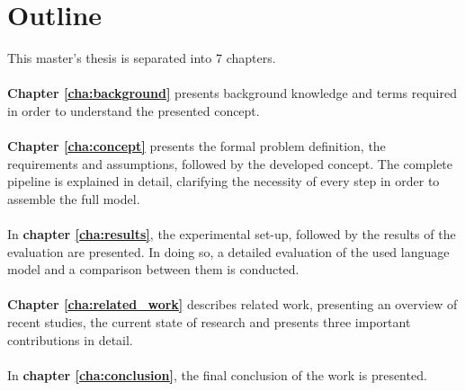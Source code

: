 

\section{Outline\label{sec:outline}}


This master's thesis is separated into 7 chapters.
\\
\\
\textbf{Chapter \ref{cha:background}} presents background knowledge and terms required in order to understand the presented concept.
\\
\\
\textbf{Chapter \ref{cha:concept}} presents the formal problem definition, the requirements and assumptions, followed by the developed concept. The complete pipeline is explained in detail, clarifying the necessity of every step in order to assemble the full model.
\\
\\
In \textbf{chapter \ref{cha:results}}, the experimental set-up, followed by the results of the evaluation are presented. In doing so, a detailed evaluation of the used language model and a comparison between them is conducted.
\\
\\
\textbf{Chapter \ref{cha:related_work}} describes related work, presenting an overview of recent studies, the current state of research and presents three important contributions in detail.
\\
\\
In \textbf{chapter \ref{cha:conclusion}}, the final conclusion of the work is presented.



